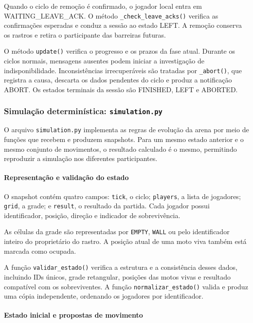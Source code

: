 \documentclass[11pt,a4paper]{article}
\begin{document}
Quando o ciclo de remoção é confirmado, o jogador local entra em WAITING\_LEAVE\_ACK. O método \texttt{\_check\_leave\_acks()} verifica as confirmações esperadas e conduz a sessão ao estado LEFT. A remoção conserva os rastros e retira o participante das barreiras futuras.

O método \texttt{update()} verifica o progresso e os prazos da fase atual. Durante os ciclos normais, mensagens ausentes podem iniciar a investigação de indisponibilidade. Inconsistências irrecuperáveis são tratadas por \texttt{\_abort()}, que registra a causa, descarta os dados pendentes do ciclo e produz a notificação ABORT. Os estados terminais da sessão são FINISHED, LEFT e ABORTED.

\subsubsection{Simulação determinística: \texttt{simulation.py}}
\label{sec:implementacao-simulation}

O arquivo \texttt{simulation.py} implementa as regras de evolução da arena por meio de funções que recebem e produzem snapshots. Para um mesmo estado anterior e o mesmo conjunto de movimentos, o resultado calculado é o mesmo, permitindo reproduzir a simulação nos diferentes participantes.

\paragraph{Representação e validação do estado}

O snapshot contém quatro campos: \texttt{tick}, o ciclo; \texttt{players}, a lista de jogadores; \texttt{grid}, a grade; e \texttt{result}, o resultado da partida. Cada jogador possui identificador, posição, direção e indicador de sobrevivência.

As células da grade são representadas por \texttt{EMPTY}, \texttt{WALL} ou pelo identificador inteiro do proprietário do rastro. A posição atual de uma moto viva também está marcada como ocupada.

A função \texttt{validar\_estado()} verifica a estrutura e a consistência desses dados, incluindo IDs únicos, grade retangular, posições das motos vivas e resultado compatível com os sobreviventes. A função \texttt{normalizar\_estado()} valida e produz uma cópia independente, ordenando os jogadores por identificador.

\paragraph{Estado inicial e propostas de movimento}
\end{document}
